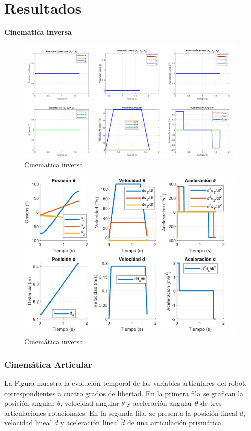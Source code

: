 \chapter{Resultados} \label{chap:resultados}
\textbf{Cinematica inversa}

\begin{figure} [h]
	\centering
	\includegraphics[width=0.7\linewidth]{"../cinematica inversa/img/graficas_taryectoria 2"}
	\caption{Cinematica inversa}
	\label{fig:graficastaryectoria-2}
\end{figure}

\begin{figure} [h]
	\centering
	\includegraphics[width=0.7\linewidth]{"../cinematica inversa/img/cinematica articular_trayectoria2"}
	\caption{Cinemática inversa}
	\label{fig:cinematica-articulartrayectoria2}
\end{figure}
\newpage

\subsection{Cinemática Articular}
La Figura muestra la evolución temporal de las variables articulares del robot, correspondientes a cuatro grados de libertad. En la primera fila se grafican la posición angular $\theta$, velocidad angular $\dot{\theta}$ y aceleración angular $\ddot{\theta}$ de tres articulaciones rotacionales. En la segunda fila, se presenta la posición lineal $d$, velocidad lineal $\dot{d}$ y aceleración lineal $\ddot{d}$ de una articulación prismática. 

